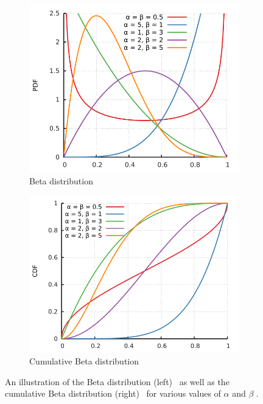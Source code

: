 \begin{figure}[htbp]
      \begin{subfigure}{0.49\textwidth}
            \includegraphics[width=\textwidth]{images/beta_various.png}
            \caption{Beta distribution}
            \label{fig:probability:probability_distributions:beta_normal}
      \end{subfigure}
      \begin{subfigure}{0.49\textwidth}
            \includegraphics[width=\textwidth]{images/beta_cumulative.png}
            \caption{Cumulative Beta distribution}
            \label{fig:probability:probability_distributions:beta_cumulative}
      \end{subfigure}
      \par\bigskip
      \caption{An illustration of the Beta distribution (left)~\cite{ref:beta:2014} as well as the cumulative Beta distribution (right)~\cite{ref:cumulativebeta:2014} for various values of $\alpha$ and $\beta$ .}
      \label{fig:probability:probability_distributions:beta}
\end{figure}


